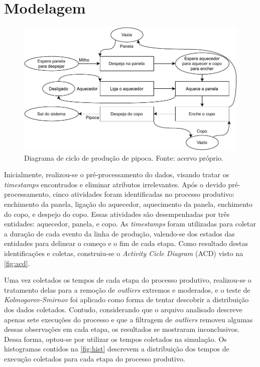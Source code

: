 \documentclass[12pt]{article}
\begin{document}
\section{Modelagem}
\label{sec:modelagem}

\begin{figure}[h]
    \centering
    \includegraphics[width=\textwidth]{figuras/acd}
    \caption{Diagrama de ciclo de produção de pipoca. Fonte: acervo próprio.}
    \label{fig:acd}
\end{figure}

Inicialmente, realizou-se o pré-processamento do dados, visando tratar os \textit{timestamps} encontrados e eliminar atributos irrelevantes. Após o devido pré-processamento, cinco atividades foram identificadas no processo produtivo: enchimento da panela, ligação do aquecedor, aquecimento da panela, enchimento do copo, e despejo do copo. Essas atividades são desempenhadas por três entidades: aquecedor, panela, e copo. As \textit{timestamps} foram utilizadas para coletar a duração de cada evento da linha de produção, valendo-se dos estados das entidades para delinear o começo e o fim de cada etapa. Como resultado destas identificações e coletas, construiu-se o \textit{Activity Cicle Diagram} (ACD) visto na \autoref{fig:acd}.

Uma vez coletados os tempos de cada etapa do processo produtivo, realizou-se o tratamento delas para a remoção de \textit{outliers} extremos e moderados, e o teste de \textit{Kolmogorov-Smirnov} foi aplicado como forma de tentar descobrir a distribuição dos dados coletados. Contudo, considerando que o arquivo analisado descreve apenas sete execuções do processo e que a filtragem de \textit{outliers} removeu algumas dessas observações em cada etapa, os resultados se mostraram inconclusivos. Dessa forma, optou-se por utilizar os tempos coletados na simulação. Os histogramas contidos na \autoref{fig:hist} descrevem a distribuição dos tempos de execução coletados para cada etapa do processo produtivo.
\end{document}
